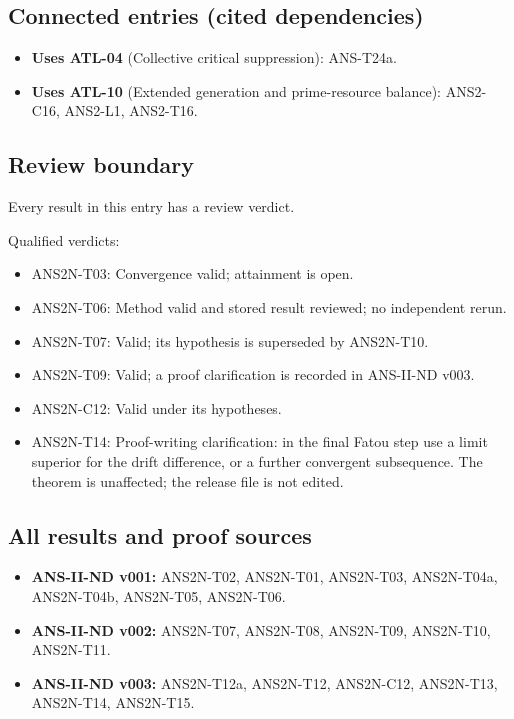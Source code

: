 \documentclass[
  11pt,
]{article}
\providecommand{\tightlist}{%
  \setlength{\itemsep}{0pt}\setlength{\parskip}{0pt}}
\begin{document}
\hypertarget{connected-entries-cited-dependencies-10}{%
\subsection{Connected entries (cited
dependencies)}\label{connected-entries-cited-dependencies-10}}

\begin{itemize}
\tightlist
\item
  \textbf{Uses ATL-04} (Collective critical suppression): ANS-T24a.
\item
  \textbf{Uses ATL-10} (Extended generation and prime-resource balance):
  ANS2-C16, ANS2-L1, ANS2-T16.
\end{itemize}

\hypertarget{review-boundary-10}{%
\subsection{Review boundary}\label{review-boundary-10}}

Every result in this entry has a review verdict.

Qualified verdicts:

\begin{itemize}
\tightlist
\item
  ANS2N-T03: Convergence valid; attainment is open.
\item
  ANS2N-T06: Method valid and stored result reviewed; no independent
  rerun.
\item
  ANS2N-T07: Valid; its hypothesis is superseded by ANS2N-T10.
\item
  ANS2N-T09: Valid; a proof clarification is recorded in ANS-II-ND v003.
\item
  ANS2N-C12: Valid under its hypotheses.
\item
  ANS2N-T14: Proof-writing clarification: in the final Fatou step use a
  limit superior for the drift difference, or a further convergent
  subsequence. The theorem is unaffected; the release file is not
  edited.
\end{itemize}

\hypertarget{all-results-and-proof-sources-10}{%
\subsection{All results and proof
sources}\label{all-results-and-proof-sources-10}}

\begin{itemize}
\tightlist
\item
  \textbf{ANS-II-ND v001:} ANS2N-T02, ANS2N-T01, ANS2N-T03, ANS2N-T04a,
  ANS2N-T04b, ANS2N-T05, ANS2N-T06.
\item
  \textbf{ANS-II-ND v002:} ANS2N-T07, ANS2N-T08, ANS2N-T09, ANS2N-T10,
  ANS2N-T11.
\item
  \textbf{ANS-II-ND v003:} ANS2N-T12a, ANS2N-T12, ANS2N-C12, ANS2N-T13,
  ANS2N-T14, ANS2N-T15.
\end{itemize}
\end{document}

